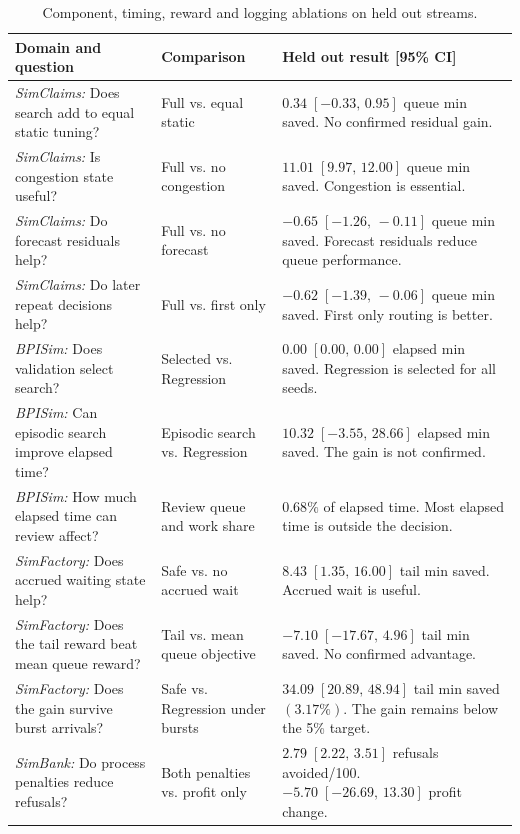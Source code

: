 \begin{table}[!t]
\caption{Component, timing, reward and logging ablations on held out streams.}
\label{tab:ablations}
\centering\fontsize{6.5}{7.1}\selectfont
\setlength{\tabcolsep}{4pt}
\renewcommand{\arraystretch}{0.92}
\begin{tabularx}{\textwidth}{@{}L{2.35in}L{1.55in}Y@{}}
\toprule
Domain and question & Comparison & Held out result [95\% CI] \\
\midrule
\textit{SimClaims:} Does search add to equal static tuning? & Full vs. equal static & $0.34\;[-0.33,\,0.95]$ queue min saved. No confirmed residual gain. \\
\textit{SimClaims:} Is congestion state useful? & Full vs. no congestion & $11.01\;[9.97,\,12.00]$ queue min saved. Congestion is essential. \\
\textit{SimClaims:} Do forecast residuals help? & Full vs. no forecast & $-0.65\;[-1.26,\,-0.11]$ queue min saved. Forecast residuals reduce queue performance. \\
\textit{SimClaims:} Do later repeat decisions help? & Full vs. first only & $-0.62\;[-1.39,\,-0.06]$ queue min saved. First only routing is better. \\
\midrule
\textit{BPISim:} Does validation select search? & Selected vs. Regression & $0.00\;[0.00,\,0.00]$ elapsed min saved. Regression is selected for all seeds. \\
\textit{BPISim:} Can episodic search improve elapsed time? & Episodic search vs. Regression & $10.32\;[-3.55,\,28.66]$ elapsed min saved. The gain is not confirmed. \\
\textit{BPISim:} How much elapsed time can review affect? & Review queue and work share & $0.68\%$ of elapsed time. Most elapsed time is outside the decision. \\
\midrule
\textit{SimFactory:} Does accrued waiting state help? & Safe vs. no accrued wait & $8.43\;[1.35,\,16.00]$ tail min saved. Accrued wait is useful. \\
\textit{SimFactory:} Does the tail reward beat mean queue reward? & Tail vs. mean queue objective & $-7.10\;[-17.67,\,4.96]$ tail min saved. No confirmed advantage. \\
\textit{SimFactory:} Does the gain survive burst arrivals? & Safe vs. Regression under bursts & $34.09\;[20.89,\,48.94]$ tail min saved $(3.17\%)$. The gain remains below the 5\% target. \\
\midrule
\textit{SimBank:} Do process penalties reduce refusals? & Both penalties vs. profit only & $2.79\;[2.22,\,3.51]$ refusals avoided/100. $-5.70\;[-26.69,\,13.30]$ profit change. \\

\end{tabularx}
\end{table}
